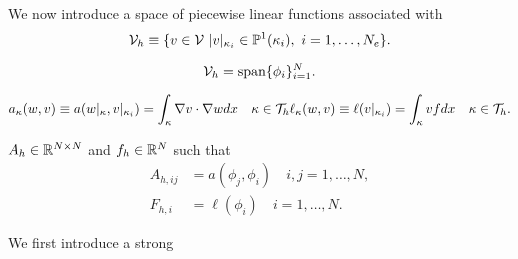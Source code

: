 We now introduce a space of piecewise linear functions associated with 
\begin{equation*}
  \mathcal{V}_h \equiv \{ v \in \mathcal{V} \ | v |_{\kappa_i} \in \mathbb{P}^1(\kappa_i), \ i = 1,\dots, N_e \}.
\end{equation*}

\begin{equation*}
  \mathcal{V}_h = \text{span} \{ \phi_i \}_{i=1}^N.
\end{equation*}

\begin{equation*}
  a_{\kappa}(w,v) \equiv a(w|_{\kappa},v|_{\kappa_i})
  = \int_\kappa \nabla v \cdot \nabla w dx \quad \kappa \in \mathcal{T}_h
  \\
  \ell_\kappa(w,v) \equiv \ell(v|_{\kappa_i})
  = \int_\kappa v f dx \quad \kappa \in \mathcal{T}_h.
\end{equation*}


$A_h \in \mathbb{R}^{N \times N}$ and $f_h \in \mathbb{R}^{N}$ such that
\begin{align*}
  A_{h,ij} &= a(\phi_j,\phi_i) \quad i,j = 1,\dots,N, \\
  F_{h,i} &= \ell(\phi_i) \quad i = 1,\dots,N.
\end{align*}



We first introduce a strong 
